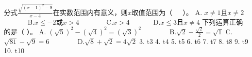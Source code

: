 \markdownRendererDocumentBegin
\markdownRendererOlBeginTight
{}分式$\frac{\sqrt{(x-1)^2-9}}{x-4}$在实数范围内有意义，则$x$取值范围为（~~~）。\markdownRendererOlItemEnd 
\markdownRendererOlEndTight \markdownRendererInterblockSeparator
{}A. $x\neq 1$且$x\neq 2$~~~~~~~B.$x\le-2$或$x>4$~~~~~~~~C.$x>4$~~~~~~~D.$x\le3$且$x\neq4$\markdownRendererInterblockSeparator
{}\markdownRendererOlBeginTight
{}下列运算正确的是（ ）。 A. $(\sqrt{5})^2-(\sqrt{4})^2=(\sqrt{3})^2$ ~~~~~~~ B.$\sqrt{2}-\frac{\sqrt{2}}{2}=\sqrt{1}$\markdownRendererOlItemEnd 
\markdownRendererOlEndTight \markdownRendererInterblockSeparator
{}C. $\sqrt{81}-\sqrt{9}=6$ ~~~~~~~ D.$\sqrt{8}+\sqrt{2}=4\sqrt{2}$ 3. t3 4. t4 5. t5 6. t6 7. t7 8. t8 9. t9 10. t10\markdownRendererDocumentEnd